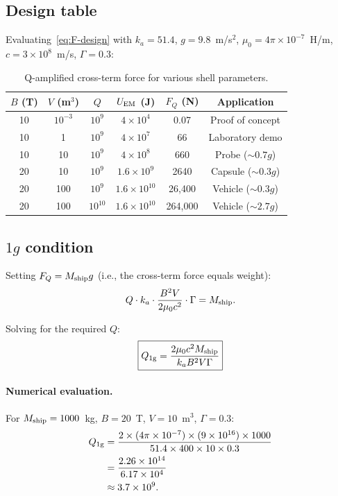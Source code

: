\documentclass[aps,prd,twocolumn,superscriptaddress,nofootinbib]{revtex4-2}
\newcommand{\ka}{k_a}
\begin{document}
\subsection{Design table}

Evaluating~\eqref{eq:F-design} with $\ka = 51.4$, $g = 9.8$~m/s$^2$,
$\mu_0 = 4\pi \times 10^{-7}$~H/m, $c = 3 \times 10^8$~m/s,
$\Gamma = 0.3$:

\begin{table}[h]
\caption{Q-amplified cross-term force for various shell parameters.}
\label{tab:design}
\begin{ruledtabular}
\begin{tabular}{cccccc}
$B$ (T) & $V$ (m$^3$) & $Q$ & $U_{\rm EM}$ (J) & $F_Q$ (N) & Application \\
\hline
10 & $10^{-3}$ & $10^9$ & $4 \times 10^4$ & 0.07 & Proof of concept \\
10 & 1 & $10^9$ & $4 \times 10^7$ & 66 & Laboratory demo \\
10 & 10 & $10^9$ & $4 \times 10^8$ & 660 & Probe ($\sim 0.7g$) \\
20 & 10 & $10^9$ & $1.6 \times 10^9$ & 2640 & Capsule ($\sim 0.3g$) \\
20 & 100 & $10^9$ & $1.6 \times 10^{10}$ & 26,400 & Vehicle ($\sim 0.3g$) \\
20 & 100 & $10^{10}$ & $1.6 \times 10^{10}$ & 264,000 & Vehicle ($\sim 2.7g$) \\
\end{tabular}
\end{ruledtabular}
\end{table}

\subsection{$1g$ condition}

Setting $F_Q = M_{\rm ship} g$ (i.e., the cross-term force equals
weight):
\begin{equation}
Q \cdot \ka \cdot \frac{B^2 V}{2\mu_0 c^2} \cdot \Gamma = M_{\rm ship}.
\label{eq:1g-condition}
\end{equation}

Solving for the required $Q$:
\begin{equation}
\boxed{
Q_{\rm 1g} = \frac{2\mu_0 c^2 M_{\rm ship}}{\ka B^2 V \Gamma}
}
\label{eq:Q-1g}
\end{equation}

\paragraph{Numerical evaluation.}
For $M_{\rm ship} = 1000$~kg, $B = 20$~T, $V = 10$~m$^3$,
$\Gamma = 0.3$:
\begin{align}
Q_{\rm 1g} &= \frac{2 \times (4\pi \times 10^{-7}) \times (9 \times 10^{16})
  \times 1000}{51.4 \times 400 \times 10 \times 0.3} \notag \\
&= \frac{2.26 \times 10^{14}}{6.17 \times 10^4} \notag \\
&\approx 3.7 \times 10^9.
\label{eq:Q-1g-num}
\end{align}
\end{document}
